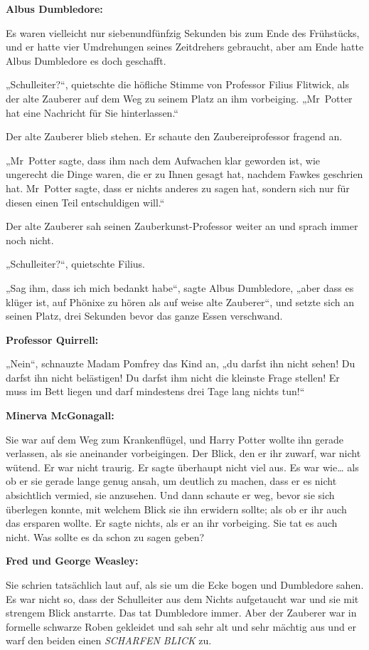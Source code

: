 {\textbf{Albus Dumbledore:}

Es waren vielleicht nur siebenundfünfzig Sekunden bis zum Ende des Frühstücks, und er hatte vier Umdrehungen seines Zeitdrehers gebraucht, aber am Ende hatte Albus Dumbledore es doch geschafft.

„Schulleiter?“, quietschte die höfliche Stimme von Professor Filius Flitwick, als der alte Zauberer auf dem Weg zu seinem Platz an ihm vorbeiging. „Mr~Potter hat eine Nachricht für Sie hinterlassen.“

Der alte Zauberer blieb stehen. Er schaute den Zaubereiprofessor fragend an.

„Mr~Potter sagte, dass ihm nach dem Aufwachen klar geworden ist, wie ungerecht die Dinge waren, die er zu Ihnen gesagt hat, nachdem Fawkes geschrien hat. Mr~Potter sagte, dass er nichts anderes zu sagen hat, sondern sich nur für diesen einen Teil entschuldigen will.“

Der alte Zauberer sah seinen Zauberkunst-Professor weiter an und sprach immer noch nicht.

„Schulleiter?“, quietschte Filius.

„Sag ihm, dass ich mich bedankt habe“, sagte Albus Dumbledore, „aber dass es klüger ist, auf Phönixe zu hören als auf weise alte Zauberer“, und setzte sich an seinen Platz, drei Sekunden bevor das ganze Essen verschwand.

\textbf{Professor Quirrell:}

„Nein“, schnauzte Madam Pomfrey das Kind an, „du darfst ihn nicht sehen! Du darfst ihn nicht belästigen! Du darfst ihm nicht die kleinste Frage stellen! Er muss im Bett liegen und darf mindestens drei Tage lang nichts tun!“

\textbf{Minerva McGonagall:}

Sie war auf dem Weg zum Krankenflügel, und Harry Potter wollte ihn gerade verlassen, als sie aneinander vorbeigingen. Der Blick, den er ihr zuwarf, war nicht wütend. Er war nicht traurig. Er sagte überhaupt nicht viel aus. Es war wie… als ob er sie gerade lange genug ansah, um deutlich zu machen, dass er es nicht absichtlich vermied, sie anzusehen. Und dann schaute er weg, bevor sie sich überlegen konnte, mit welchem Blick sie ihn erwidern sollte; als ob er ihr auch das ersparen wollte. Er sagte nichts, als er an ihr vorbeiging. Sie tat es auch nicht. Was sollte es da schon zu sagen geben?

\textbf{Fred und George Weasley:}

Sie schrien tatsächlich laut auf, als sie um die Ecke bogen und Dumbledore sahen. Es war nicht so, dass der Schulleiter aus dem Nichts aufgetaucht war und sie mit strengem Blick anstarrte. Das tat Dumbledore immer. Aber der Zauberer war in formelle schwarze Roben gekleidet und sah sehr alt und sehr mächtig aus und er warf den beiden einen \emph{SCHARFEN BLICK} zu.

}
